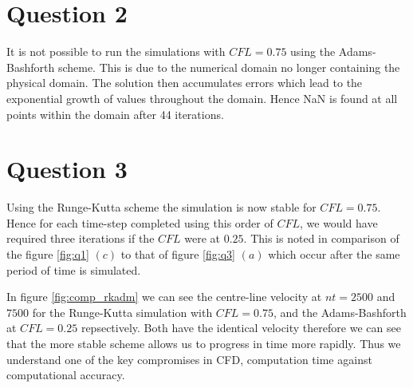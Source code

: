\documentclass[10pt, a4paper]{article}
\begin{document}
\section*{Question 2}

\noindent
\newline
It is not possible to run the simulations with $CFL = 0.75$ using the Adams-Bashforth scheme. This is due to the numerical domain no longer containing the physical domain. The solution then accumulates errors which lead to the exponential growth of values throughout the domain. Hence NaN is found at all points within the domain after 44 iterations.
\newpage
\section*{Question 3}

\noindent
\newline
Using the Runge-Kutta scheme the simulation is now stable for $CFL=0.75$. Hence for each time-step completed using this order of $CFL$, we would have required three iterations if the $CFL$ were at $0.25$. This is noted in comparison of the figure \ref{fig:q1} $(c)$ to that of figure \ref{fig:q3} $(a)$ which occur after the same period of time is simulated.

In figure \ref{fig:comp_rkadm} we can see the centre-line velocity at $nt = 2500$ and $7500$ for the Runge-Kutta simulation with $CFL =  0.75$, and the Adams-Bashforth at $CFL = 0.25$ repsectively. Both have the identical velocity therefore we can see that the more stable scheme allows us to progress in time more rapidly. Thus we understand one of the key compromises in CFD, computation time against computational accuracy.
\end{document}
